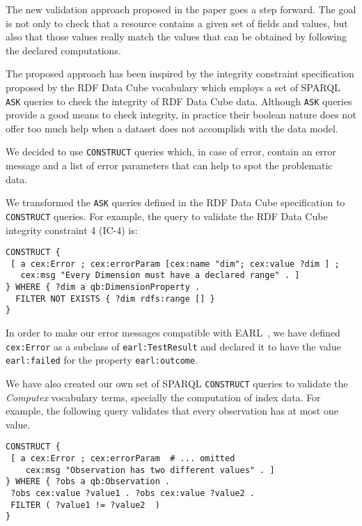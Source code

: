 The new validation approach proposed in the paper goes a step forward. 
The goal is not only to check that a resource contains
 a given set of fields and values, but also that those values really match
 the values that can be obtained by following the declared computations.
 
The proposed approach has been inspired by the integrity
constraint specification proposed by the RDF Data Cube vocabulary 
which employs a set of SPARQL
 \lstinline|ASK| queries to check the integrity of RDF Data Cube data. 
 Although \lstinline|ASK| queries provide a good means to check integrity, in
 practice their boolean nature does not offer too much help when a 
 dataset does not accomplish with the data model.

 We decided to use \lstinline|CONSTRUCT| queries which, in case of error, 
  contain an error message and a list of error parameters that can help to spot
  the problematic data.

 We transformed the \lstinline|ASK| queries defined in the RDF Data Cube
 specification to \lstinline|CONSTRUCT| queries. For example, the
 query to validate the RDF Data Cube integrity constraint 4 (IC-4) is:
 
\begin{lstlisting}[style=SPARQL]
CONSTRUCT {
 [ a cex:Error ; cex:errorParam [cex:name "dim"; cex:value ?dim ] ;
   cex:msg "Every Dimension must have a declared range" . ]
} WHERE { ?dim a qb:DimensionProperty .
  FILTER NOT EXISTS { ?dim rdfs:range [] }
}
\end{lstlisting}
 
In order to make our error messages compatible with EARL~\cite{EARL}, we have
 defined \lstinline|cex:Error| as a subclass of \lstinline|earl:TestResult| and 
 declared it to have the value \lstinline|earl:failed| for the property
 \lstinline|earl:outcome|.
 
We have also created our own set of SPARQL \lstinline|CONSTRUCT| queries to
validate the \emph{Computex} vocabulary terms, specially the computation of index data.
For example, the following query validates that every observation 
  has at most one value.
 
\begin{lstlisting}[style=SPARQL]
CONSTRUCT {
 [ a cex:Error ; cex:errorParam  # ... omitted 
    cex:msg "Observation has two different values" . ]
} WHERE { ?obs a qb:Observation . 
 ?obs cex:value ?value1 . ?obs cex:value ?value2 .
 FILTER ( ?value1 != ?value2  )
}
\end{lstlisting}

